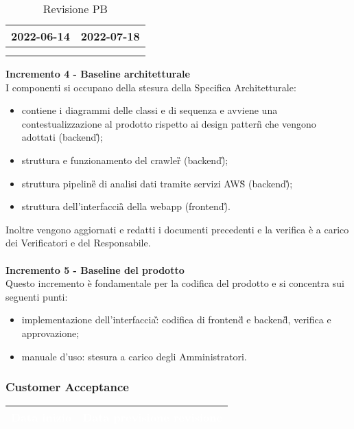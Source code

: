 {{{\begin{longtable}{C{.4\freewidth} C{.4\freewidth}}
        2022-06-14 & 2022-07-18 \\
        \bottomrule
        \\
        \caption{Revisione PB}
        \end{longtable}
    \textbf{Incremento 4 - Baseline architetturale} \\
    I componenti si occupano della stesura della Specifica Architetturale: 
    \begin{itemize}
        \item contiene i diagrammi delle classi e di sequenza e avviene una contestualizzazione al prodotto rispetto ai design pattern\G{} che vengono adottati (backend\G);
        \item struttura e funzionamento del crawler\G{} (backend\G);
        \item struttura pipeline\G{} di analisi dati tramite servizi AWS\G{} (backend\G);
        \item struttura dell'interfaccia\G{} della webapp (frontend\G).
    \end{itemize}
    Inoltre vengono aggiornati e redatti i documenti precedenti e la verifica è a carico dei Verificatori e del Responsabile.\\ \\
    \textbf{Incremento 5 - Baseline del prodotto} \\
    Questo incremento è fondamentale per la codifica del prodotto e si concentra sui seguenti punti:
    \begin{itemize}
        \item implementazione dell'interfaccia\G: codifica di frontend\G{} e backend\G{}, verifica e approvazione;
        \item manuale d'uso: stesura a carico degli Amministratori.
    \end{itemize}
    }
\newpage
    \subsubsection{Customer Acceptance} {
        \setlength{\freewidth}{\dimexpr\textwidth-30\tabcolsep}
        \renewcommand{\arraystretch}{1.0}
        \setlength{\aboverulesep}{0pt}
        \setlength{\belowrulesep}{0pt}
        \begin{longtable}{C{.4\freewidth} C{.4\freewidth}}
        \toprule
        \textcolor{white}{\textbf{Data inizio}}&
        \textcolor{white}{\textbf{Data previsione revisione}} \\
        \toprule
        \endhead
            

\end{longtable}}}}
